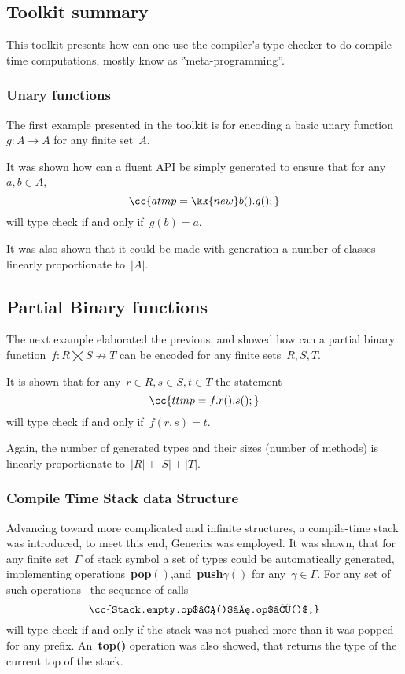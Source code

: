
\subsection{Toolkit summary}
This toolkit presents how can one use the \Java compiler's
type checker to do compile time computations, mostly know as
‟meta-programming”.

\subsubsection*{Unary functions}
The first example presented in the toolkit is for encoding a
basic unary function~$g:A→A$ for any finite set~$A$.

It was shown how can a fluent API be simply generated
to ensure that for any~$a,b∈A$,
\[
  \cc{a tmp = \kk{new} b().g();}
\]
will type check if and only if~$g(b)=a$.

It was also shown that it could be made with generation
a number of classes linearly proportionate to~$|A|$.

\subsection*{Partial Binary functions}
The next example elaborated the previous, and showed
how can a partial binary function~$f:R⨉S↛T$
can be encoded for any finite sets~$R,S,T$.

It is shown that for any~$r∈R, s∈S, t∈T$
the statement
\[
  \cc{t tmp = f.r().s();}
\]
will type check if and only if~$f(r,s)=t$.

Again, the number of generated types and their sizes (number of methods)
is linearly proportionate to~$|R|+|S|+|T|$.

\subsubsection*{Compile Time Stack data Structure}
Advancing toward more complicated and infinite structures,
a compile-time stack was introduced, to meet this end,
\Java Generics was employed.
It was shown, that for any finite set~$Γ$ of stack symbol
a set of \Java types could be automatically generated,
implementing operations~\textbf{pop$()$},and~\textbf{push$γ()$}
for any~$γ∈Γ$.
For any set of such operations~ the sequence of calls\[
\cc{Stack.empty.op$₁()$….op$ₖ()$;}
\]
will type check if and only if the stack was not pushed more
than it was popped for any prefix.
An~\textbf{top()} operation was also showed, that returns the type
of the current top of the stack.

